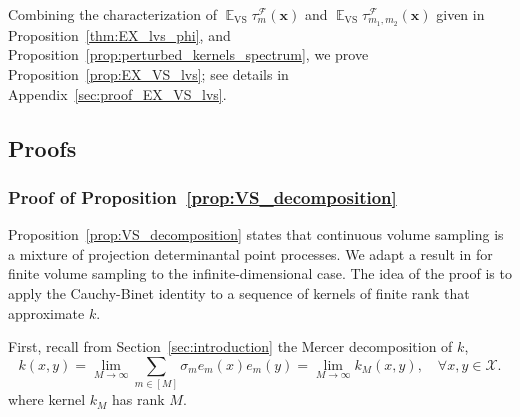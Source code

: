 \documentclass[twoside,11pt]{book}
\numberwithin{theorem}{chapter}
\numberwithin{definition}{chapter}
\numberwithin{proposition}{chapter}
\numberwithin{corollary}{chapter}
\numberwithin{example}{chapter}
\numberwithin{lemma}{chapter}
\DeclareMathOperator{\VS}{\mathrm{VS}}
\DeclareMathOperator{\EX}{\mathbb{E}}
\DeclareMathOperator{\F}{\mathcal{F}}
\begin{document}
Combining the characterization of $\EX_{\VS} \tau_{m}^{\F}(\bm{x})$ and $\EX_{\VS} \tau_{m_{1},m_{2}}^{\F}(\bm{x})$ given in Proposition~\ref{thm:EX_lvs_phi}, and Proposition~\ref{prop:perturbed_kernels_spectrum}, we prove Proposition~\ref{prop:EX_VS_lvs}; see details in Appendix~\ref{sec:proof_EX_VS_lvs}.



\subsection{Proofs}


 \subsubsection{Proof of Proposition~\ref{prop:VS_decomposition}}\label{sec:proof_VS_decomposition}

Proposition~\ref{prop:VS_decomposition} states that continuous volume sampling is a mixture of projection determinantal point processes. We adapt a result in \citep[Chapter 5]{KuTa12} for finite volume sampling to the infinite-dimensional case. The idea of the proof is to apply the Cauchy-Binet identity to a sequence of kernels of finite rank that approximate $k$.

First, recall from Section~\ref{sec:introduction} the Mercer decomposition of $k$,
\begin{equation}\label{eq:Mercer_decomposition_1}
k(x,y) = \lim_{M\rightarrow \infty}\sum\limits_{m\in [M]} \sigma_{m} e_{m}(x)e_{m}(y) = \lim_{M\rightarrow \infty} k_M(x,y), \quad\forall x,y\in\mathcal{X}.
\end{equation}
where kernel $k_M$ has rank $M$.
\end{document}
